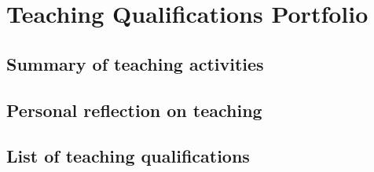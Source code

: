 \chapter{Teaching Qualifications Portfolio}

\section{Summary of teaching activities} \label{sec:summary-of-teaching-activities}

\section{Personal reflection on teaching} \label{sec:personal-reflection-on-teaching}

\section{List of teaching qualifications} \label{sec:list-of-teaching-qualifications}
